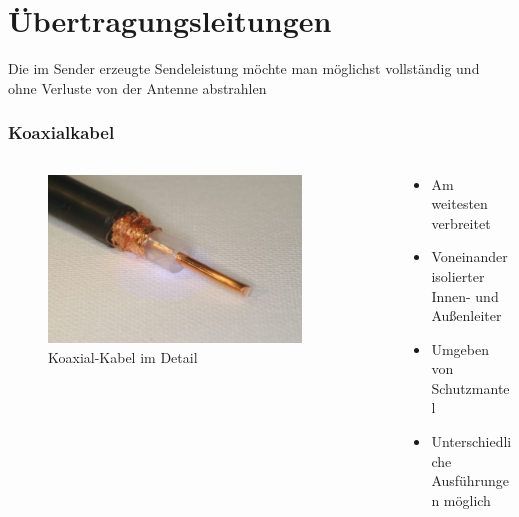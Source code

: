 
\section{Übertragungsleitungen}
\label{section:uebertragungsleitungen}
\begin{frame}%
Die im Sender erzeugte Sendeleistung möchte man möglichst vollständig und ohne Verluste von der Antenne abstrahlen

\end{frame}

\begin{frame}
\frametitle{Koaxialkabel}
\begin{columns}
    \begin{column}{0.48\textwidth}
    
\begin{figure}
    \includegraphics[width=0.85\textwidth]{foto/65}
    \caption{\scriptsize Koaxial-Kabel im Detail}
    \label{n_Koax_Detail}
\end{figure}

    \end{column}
   \begin{column}{0.48\textwidth}
       \begin{itemize}
  \item Am weitesten verbreitet
  \item Voneinander isolierter Innen- und Außenleiter
  \item Umgeben von Schutzmantel
  \item Unterschiedliche Ausführungen möglich
  \end{itemize}

   \end{column}
\end{columns}

\end{frame}

